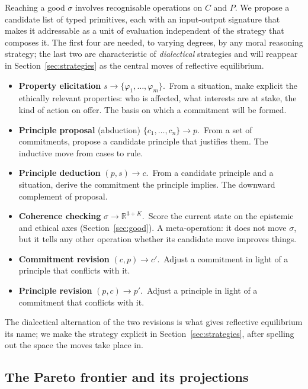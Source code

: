 \documentclass{article}
\begin{document}
Reaching a good $\sigma$ involves recognisable operations on $C$ and $P$.
We propose a candidate list of typed primitives, each with an
input-output signature that makes it addressable as a unit of evaluation
independent of the strategy that composes it. The first four are needed,
to varying degrees, by any moral reasoning strategy; the last two are
characteristic of \emph{dialectical} strategies and will reappear in
Section~\ref{sec:strategies} as the central moves of reflective
equilibrium.
\begin{itemize}[leftmargin=*, itemsep=2pt]
  \item \textbf{Property elicitation} \;$s \to \{\varphi_1, \dots, \varphi_m\}$.\,
    From a situation, make explicit the ethically relevant properties: who
    is affected, what interests are at stake, the kind of action on offer.
    The basis on which a commitment will be formed.
  \item \textbf{Principle proposal} (abduction) \;$\{c_1, \dots, c_n\} \to p$.\,
    From a set of commitments, propose a candidate principle that justifies
    them. The inductive move from cases to rule.
  \item \textbf{Principle deduction} \;$(p, s) \to c$.\, From a candidate
    principle and a situation, derive the commitment the principle implies.
    The downward complement of proposal.
  \item \textbf{Coherence checking} \;$\sigma \to \mathbb{R}^{3+K}$.\, Score
    the current state on the epistemic and ethical axes (Section~\ref{sec:good}).
    A meta-operation: it does not move $\sigma$, but it tells any other
    operation whether its candidate move improves things.
  \item \textbf{Commitment revision} \;$(c, p) \to c'$.\, Adjust a
    commitment in light of a principle that conflicts with it.
  \item \textbf{Principle revision} \;$(p, c) \to p'$.\, Adjust a principle
    in light of a commitment that conflicts with it.
\end{itemize}
The dialectical alternation of the two revisions \citep{rawls1971,beisbart2021}
is what gives reflective equilibrium its name; we make the strategy
explicit in Section~\ref{sec:strategies}, after spelling out the space the
moves take place in.


\subsection{The Pareto frontier and its projections}
\label{sec:space}
\end{document}
